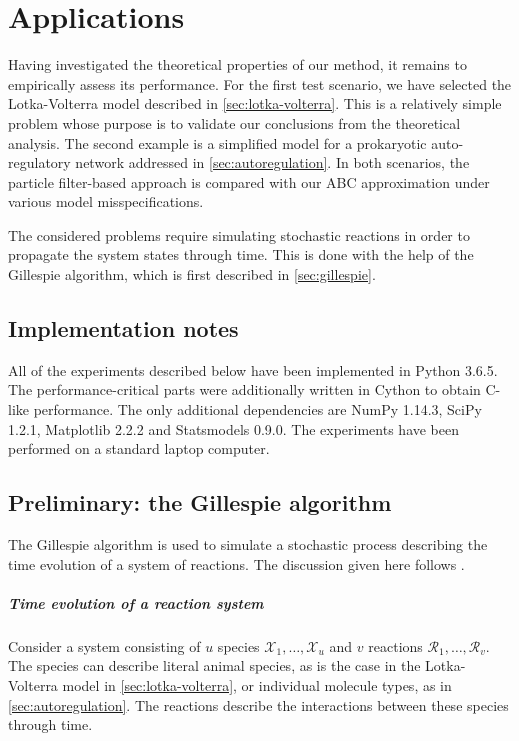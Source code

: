 \chapter{Applications}
\label{chap:applications}

Having investigated the theoretical properties of our method, it remains to empirically assess its performance. For the first test scenario, we have selected the Lotka-Volterra model described in \autoref{sec:lotka-volterra}. This is a relatively simple problem whose purpose is to validate our conclusions from the theoretical analysis. The second example is a simplified model for a prokaryotic auto-regulatory network addressed in \autoref{sec:autoregulation}. In both scenarios, the particle filter-based approach is compared with our ABC approximation under various model misspecifications.

The considered problems require simulating stochastic reactions in order to propagate the system states through time. This is done with the help of the Gillespie algorithm, which is first described in \autoref{sec:gillespie}.


\section{Implementation notes}
All of the experiments described below have been implemented in Python 3.6.5. The performance-critical parts were additionally written in Cython to obtain C-like performance. The only additional dependencies are NumPy 1.14.3, SciPy 1.2.1, Matplotlib 2.2.2 and Statsmodels 0.9.0. The experiments have been performed on a standard laptop computer.


\section{Preliminary: the Gillespie algorithm} \label{sec:gillespie}
The Gillespie algorithm \citep{gillespie1, gillespie2} is used to simulate a stochastic process describing the time evolution of a system of reactions. The discussion given here follows \cite{wilkinson-book}.

\paragraph{Time evolution of a reaction system}
Consider a system consisting of $u$ species $\mathcal{X}_1, \ldots, \mathcal{X}_u$ and $v$ reactions $\mathcal{R}_1, \ldots, \mathcal{R}_v$. The species can describe literal animal species, as is the case in the Lotka-Volterra model in \autoref{sec:lotka-volterra}, or individual molecule types, as in \autoref{sec:autoregulation}. The reactions describe the interactions between these species through time.

